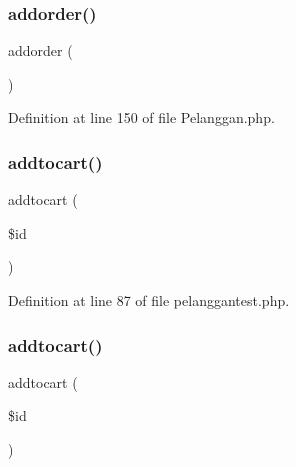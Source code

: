 \mbox{\label{class_pelanggan_a375fb206d13bec0bc37f55b825bcbebf}} 
\subsubsection{\texorpdfstring{addorder()}{addorder()}\hspace{0.1cm}{\footnotesize\ttfamily [2/2]}}
{\footnotesize\ttfamily addorder (\begin{DoxyParamCaption}{ }\end{DoxyParamCaption})}



Definition at line 150 of file Pelanggan.\+php.

\mbox{\label{class_pelanggan_ae739aac7ade34944585151952e9c523a}} 
\subsubsection{\texorpdfstring{addtocart()}{addtocart()}\hspace{0.1cm}{\footnotesize\ttfamily [1/2]}}
{\footnotesize\ttfamily addtocart (\begin{DoxyParamCaption}\item[{}]{\$id }\end{DoxyParamCaption})}



Definition at line 87 of file pelanggantest.\+php.

\mbox{\label{class_pelanggan_ae739aac7ade34944585151952e9c523a}} 
\subsubsection{\texorpdfstring{addtocart()}{addtocart()}\hspace{0.1cm}{\footnotesize\ttfamily [2/2]}}
{\footnotesize\ttfamily addtocart (\begin{DoxyParamCaption}\item[{}]{\$id }\end{DoxyParamCaption})}



